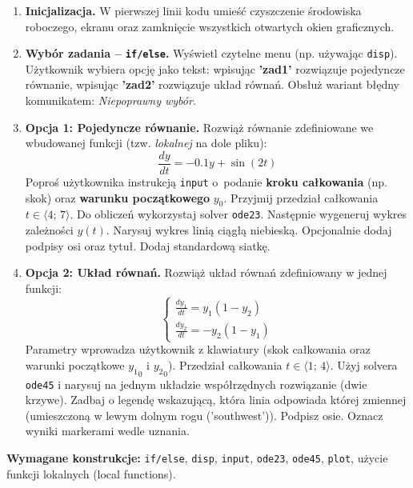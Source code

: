 \documentclass[a4paper,11pt]{article}
\begin{document}
\begin{enumerate}[leftmargin=*, label=\textbf{\arabic*.}, itemsep=2pt]

  \item \textbf{Inicjalizacja.}
    W pierwszej linii kodu umieść czyszczenie środowiska roboczego, ekranu oraz zamknięcie wszystkich otwartych okien graficznych.

  \item \textbf{Wybór zadania -- \texttt{if/else}.}
    Wyświetl czytelne menu (np. używając \texttt{disp}). Użytkownik wybiera opcję jako tekst: wpisując \textbf{'zad1'} rozwiązuje pojedyncze równanie, wpisując \textbf{'zad2'} rozwiązuje układ równań. Obsłuż wariant błędny komunikatem: \textit{Niepoprawny wybór}.

  \item \textbf{Opcja 1: Pojedyncze równanie.}
    Rozwiąż równanie zdefiniowane we wbudowanej funkcji (tzw. \textit{lokalnej} na dole pliku):
    \[ \frac{dy}{dt} = -0.1y + \sin(2t) \]
    Poproś użytkownika instrukcją \texttt{input} o~podanie \textbf{kroku całkowania} (np. skok) oraz \textbf{warunku początkowego} $y_0$. Przyjmij przedział całkowania $t \in \langle 4;\,7 \rangle$.
    Do obliczeń wykorzystaj solver \texttt{ode23}. Następnie wygeneruj wykres zależności $y(t)$. Narysuj wykres linią ciągłą niebieską. Opcjonalnie dodaj podpisy osi oraz tytuł. Dodaj standardową siatkę.

  \item \textbf{Opcja 2: Układ równań.}
    Rozwiąż układ równań zdefiniowany w jednej funkcji:\\[-0.5em]
    \[
    \begin{cases}
      \frac{dy_1}{dt} = y_1(1 - y_2) \\
      \frac{dy_2}{dt} = -y_2(1 - y_1)
    \end{cases}
    \]
    Parametry wprowadza użytkownik z klawiatury (skok całkowania oraz warunki początkowe $ {y_1}_{0} $ i $ {y_2}_{0} $). Przedział całkowania $t \in \langle 1;\,4 \rangle$.
    Użyj solvera \texttt{ode45} i narysuj na jednym układzie współrzędnych rozwiązanie (dwie krzywe). Zadbaj o legendę wskazującą, która linia odpowiada której zmiennej (umieszczoną w lewym dolnym rogu ('southwest')). Podpisz osie. Oznacz wyniki markerami wedle uznania.

\end{enumerate}

\vspace{0.3cm}
\begin{ramka}
\textbf{Wymagane konstrukcje:}
\texttt{if/else}, \texttt{disp}, \texttt{input}, \texttt{ode23}, \texttt{ode45}, \texttt{plot}, użycie funkcji lokalnych (local functions).
\end{ramka}
\end{document}
